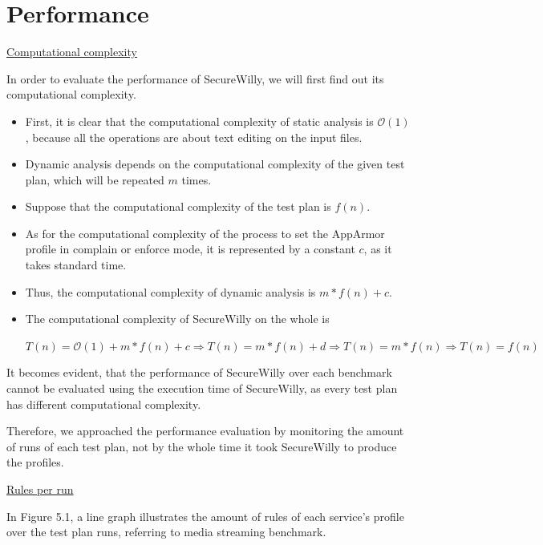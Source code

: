 \section{Performance}

\underline{Computational complexity}
\hfill\break

In order to evaluate the performance of SecureWilly, we will first find out its computational complexity.

\begin{itemize}
\item First, it is clear that the computational complexity of static analysis is $\mathcal{O}(1)$, because all the operations are about text editing on the input files.
\item Dynamic analysis depends on the computational complexity of the given test plan, which will be repeated $m$ times.

\item Suppose that the computational complexity of the test plan is $f(n)$.

\item As for the computational complexity of the process to set the AppArmor profile in complain or enforce mode, it is represented by a constant $c$, as it takes standard time.

\item Thus, the computational complexity of dynamic analysis is $m*f(n) + c$.

\item The computational complexity of SecureWilly on the whole is

$T(n) = \mathcal{O}(1) + m*f(n) + c \Rightarrow T(n) = m*f(n) + d \Rightarrow T(n) = m*f(n) \Rightarrow T(n) = f(n)$

\end{itemize}

It becomes evident, that the performance of SecureWilly over each benchmark cannot be evaluated using the execution time of SecureWilly, as every test plan has different computational complexity.

Therefore, we approached the performance evaluation by monitoring the amount of runs of each test plan, not by the whole time it took SecureWilly to produce the profiles.

\hfill\break
\underline{Rules per run}
\hfill\break

In Figure 5.1, a line graph illustrates the amount of rules of each service's profile over the test plan runs, referring to media streaming benchmark.

